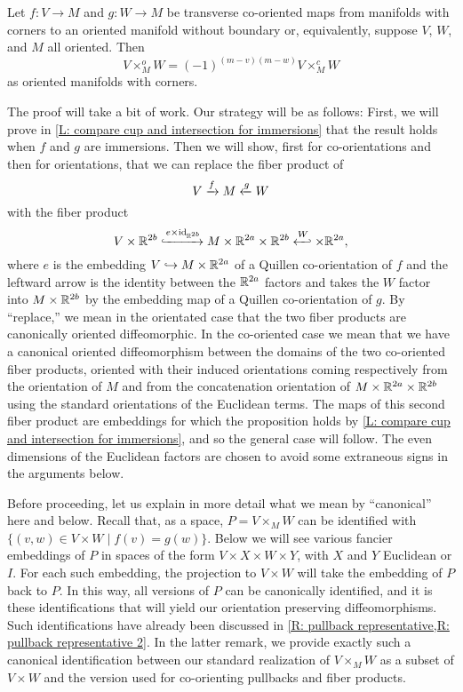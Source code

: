 \begin{proposition}\label{P: compare cup and intersection orientations}
	Let $f \colon V \to M$ and $g \colon W \to M$ be transverse co-oriented maps from manifolds with corners to an oriented manifold without boundary or, equivalently, suppose $V$, $W$, and $M$ all oriented.
	Then $$V \times_M ^oW = (-1)^{(m-v)(m-w)} V \times_M ^cW$$ as oriented manifolds with corners.
\end{proposition}

The proof will take a bit of work.
Our strategy will be as follows: First, we will prove in \cref{L: compare cup and intersection for immersions} that the result holds when $f$ and $g$ are immersions.
Then we will show, first for co-orientations and then for orientations, that we can replace the fiber product of
$$V \xrightarrow{f} M \xleftarrow{g} W$$
with the fiber product
$$V \times \R^{2b}\xhookrightarrow{e \times \id_{\R^{2b}}} M \times \R^{2a} \times \R^{2b} \xhookleftarrow W \times \R^{2a},$$
where $e$ is the embedding $V \hookrightarrow M \times \mathbb{R}^{2a}$ of a Quillen co-orientation of $f$ and the leftward arrow is the identity between the $\mathbb{R}^{2a}$ factors and takes the $W$ factor into $M \times \mathbb{R}^{2b}$ by the embedding map of a Quillen co-orientation of $g$.
By ``replace,'' we mean in the orientated case that the two fiber products are canonically oriented diffeomorphic.
In the co-oriented case we mean that we have a canonical oriented diffeomorphism
between the domains of the two co-oriented fiber products, oriented with their induced orientations coming respectively from the orientation of $M$ and from the concatenation orientation of $M \times \mathbb{R}^{2a} \times \mathbb{R}^{2b}$ using the standard orientations of the Euclidean terms.
The maps of this second fiber product are embeddings for which the proposition holds by \cref{L: compare cup and intersection for immersions}, and so the general case will follow.
The even dimensions of the Euclidean factors are chosen to avoid some extraneous signs in the arguments below.

Before proceeding, let us explain in more detail what we mean by ``canonical'' here and below.
Recall that, as a space, $P = V \times_M W$ can be identified with $\{(v,w) \in V \times W \mid f(v) = g(w)\}$.
Below we will see various fancier embeddings of $P$ in spaces of the form $V \times X \times W \times Y$, with $X$ and $Y$ Euclidean or $I$.
For each such embedding, the projection to $V \times W$ will take the embedding of $P$ back to $P$.
In this way, all versions of $P$ can be canonically identified, and it is these identifications that will yield our orientation preserving diffeomorphisms.
Such identifications have already been discussed in \cref{R: pullback representative,R: pullback representative 2}.
In the latter remark, we provide exactly such a canonical identification between our standard realization of $V \times_M W$ as a subset of $V \times W$ and the version used for co-orienting pullbacks and fiber products.

